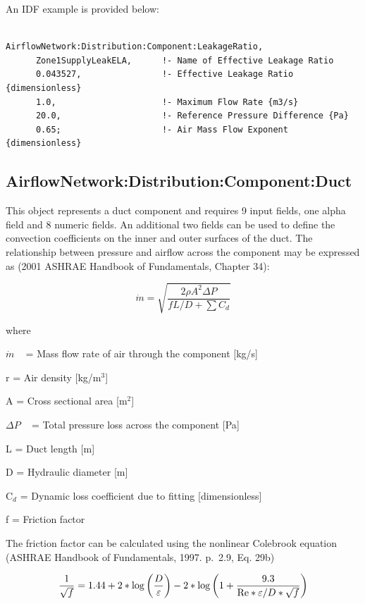 An IDF example is provided below:

\begin{lstlisting}

AirflowNetwork:Distribution:Component:LeakageRatio,
      Zone1SupplyLeakELA,      !- Name of Effective Leakage Ratio
      0.043527,                !- Effective Leakage Ratio {dimensionless}
      1.0,                     !- Maximum Flow Rate {m3/s}
      20.0,                    !- Reference Pressure Difference {Pa}
      0.65;                    !- Air Mass Flow Exponent {dimensionless}
\end{lstlisting}

\subsection{AirflowNetwork:Distribution:Component:Duct}\label{airflownetworkdistributioncomponentduct}

This object represents a duct component and requires 9 input fields, one alpha field and 8 numeric fields. An additional two fields can be used to define the convection coefficients on the inner and outer surfaces of the duct. The relationship between pressure and airflow across the component may be expressed as (2001 ASHRAE Handbook of Fundamentals, Chapter 34):

\begin{equation}
\dot m = \sqrt {\frac{{2\rho {A^2}\Delta P}}{{fL/D + \sum {C_d}}}}
\end{equation}

where

\(\dot m\) ~ = Mass flow rate of air through the component {[}kg/s{]}

r = Air density {[}kg/m\(^{3}\){]}

A = Cross sectional area {[}m\(^{2}\){]}

\(\Delta P\) ~ = Total pressure loss across the component {[}Pa{]}

L = Duct length {[}m{]}

D = Hydraulic diameter {[}m{]}

C\(_{d}\) = Dynamic loss coefficient due to fitting {[}dimensionless{]}

f = Friction factor

The friction factor can be calculated using the nonlinear Colebrook equation (ASHRAE Handbook of Fundamentals, 1997. p.~2.9, Eq. 29b)

\begin{equation}
\frac{1}{{\sqrt f }} = 1.44 + 2*\log \left( {\frac{D}{\varepsilon }} \right) - 2*\log \left( {1 + \frac{{9.3}}{{{\mathop{\rm Re}\nolimits} *\varepsilon /D*\sqrt f }}} \right)
\end{equation}

